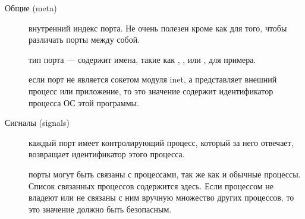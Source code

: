 \documentclass[11pt, oneside]{book}   	%
\begin{document}
\begin{description*}
\item[Общие (meta)] \hfill
\begin{description}		
	\item[] внутренний индекс порта. Не очень полезен кроме как для того, чтобы различать порты между собой.
	
	\item[] тип порта --- содержит имена, такие как , , или , для примера.
	
	\item[] если порт не является сокетом модуля inet, а представляет внешний процесс или приложение, то это значение содержит идентификатор процесса ОС этой программы.
\end{description}

\item[Сигналы (signals)] \hfill
\begin{description}		
	\item[] каждый порт имеет контролирующий процесс, который за него отвечает,  возвращает идентификатор этого процесса.
	
	\item[] порты могут быть связаны с процессами, так же как и обычные процессы. Список связанных процессов содержится здесь. Если процессом не владеют или не связаны с ним вручную множество других процессов, то это значение должно быть безопасным.
	

\end{description}
\end{description*}
\end{document}
